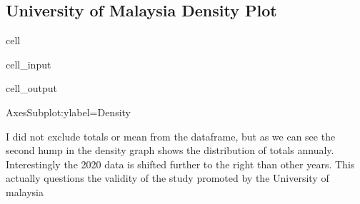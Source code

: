 \documentclass[letterpaper,10pt,english]{jupyterBook}
\begin{document}
\subsection{University of Malaysia Density Plot}
\label{\detokenize{notebooks/data_exploration:university-of-malaysia-density-plot}}
\begin{sphinxuseclass}{cell}\begin{sphinxVerbatimInput}

\begin{sphinxuseclass}{cell_input}
\begin{sphinxVerbatim}[commandchars=\\\{\}]
         
\end{sphinxVerbatim}

\end{sphinxuseclass}\end{sphinxVerbatimInput}
\begin{sphinxVerbatimOutput}

\begin{sphinxuseclass}{cell_output}
\begin{sphinxVerbatim}[commandchars=\\\{\}]
\PYGZlt{}AxesSubplot:ylabel=\PYGZsq{}Density\PYGZsq{}\PYGZgt{}
\end{sphinxVerbatim}

\noindent{}

\end{sphinxuseclass}\end{sphinxVerbatimOutput}

\end{sphinxuseclass}
\sphinxAtStartPar
I did not exclude totals or mean from the dataframe, but as we can see the second hump in the density graph shows the distribution of totals annualy.  Interestingly the 2020 data is shifted further to the right than other years.  This actually questions the validity of the study promoted by the University of malaysia
\end{document}
